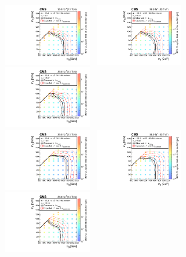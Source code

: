 \begin{figure}[!p]
  \centering
  \includegraphics[width=0.33\textwidth]{Figures/CMS-SUS-16-038_Figure_004-a.pdf}~
  \includegraphics[width=0.33\textwidth]{Figures/CMS-SUS-16-038_Figure_004-b.pdf}~
  \includegraphics[width=0.33\textwidth]{Figures/CMS-SUS-16-038_Figure_004-c.pdf}\\
  \includegraphics[width=0.33\textwidth]{Figures/CMS-SUS-16-038_Figure_004-d.pdf}~
  \includegraphics[width=0.33\textwidth]{Figures/CMS-SUS-16-038_Figure_004-e.pdf}~
  \includegraphics[width=0.33\textwidth]{Figures/CMS-SUS-16-038_Figure_004-f.pdf}\\

\end{figure}
